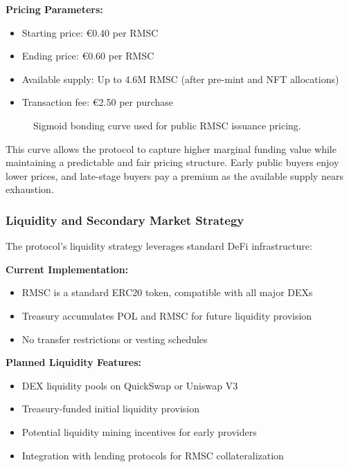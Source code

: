 \documentclass[conference]{IEEEtran}
\begin{document}
\textbf{Pricing Parameters:}
\begin{itemize}
    \item Starting price: €0.40 per RMSC
    \item Ending price: €0.60 per RMSC  
    \item Available supply: Up to 4.6M RMSC (after pre-mint and NFT allocations)
    \item Transaction fee: €2.50 per purchase
\end{itemize}
\begin{figure}[ht]
\centering
{}
\caption{Sigmoid bonding curve used for public RMSC issuance pricing.}
\label{fig:sigmoidcurve}
\end{figure}



This curve allows the protocol to capture higher marginal funding value while maintaining a predictable and fair pricing structure. Early public buyers enjoy lower prices, and late-stage buyers pay a premium as the available supply nears exhaustion.

\subsubsection{Liquidity and Secondary Market Strategy}

The protocol's liquidity strategy leverages standard DeFi infrastructure:

\textbf{Current Implementation:}
\begin{itemize}
    \item RMSC is a standard ERC20 token, compatible with all major DEXs
    \item Treasury accumulates POL and RMSC for future liquidity provision
    \item No transfer restrictions or vesting schedules
\end{itemize}

\textbf{Planned Liquidity Features:}
\begin{itemize}
    \item DEX liquidity pools on QuickSwap or Uniswap V3
    \item Treasury-funded initial liquidity provision
    \item Potential liquidity mining incentives for early providers
    \item Integration with lending protocols for RMSC collateralization
\end{itemize}
\end{document}
